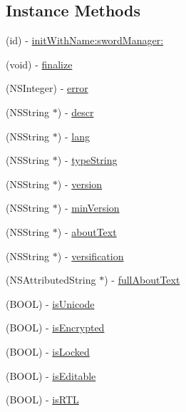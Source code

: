 \subsection*{Instance Methods}
\begin{DoxyCompactItemize}
\item 
(id) -\/ \hyperlink{interface_sword_module_a59d9654a2481d74c2f4d08c15a4910ce}{init\-With\-Name\-:sword\-Manager\-:}
\item 
(void) -\/ \hyperlink{interface_sword_module_a32d626626eee0bc4ade146973f6abb1c}{finalize}
\item 
(N\-S\-Integer) -\/ \hyperlink{interface_sword_module_a858c65e7444a8af0882d553c434506b0}{error}
\item 
(N\-S\-String $\ast$) -\/ \hyperlink{interface_sword_module_af4a37ce3ea3b890960a6449e74ca43a4}{descr}
\item 
(N\-S\-String $\ast$) -\/ \hyperlink{interface_sword_module_aad136d689eb81aac088afbf4c5e150aa}{lang}
\item 
(N\-S\-String $\ast$) -\/ \hyperlink{interface_sword_module_a12da8ac9bf5e99bead6882dbddf4eafb}{type\-String}
\item 
(N\-S\-String $\ast$) -\/ \hyperlink{interface_sword_module_a806fdedd0e4bb74dd72852de6e4b25e2}{version}
\item 
(N\-S\-String $\ast$) -\/ \hyperlink{interface_sword_module_a7871356ed4013fe0e3e97a1d8a6420a6}{min\-Version}
\item 
(N\-S\-String $\ast$) -\/ \hyperlink{interface_sword_module_afc5e2e8c8cb92b65c1c6787b4ea150b9}{about\-Text}
\item 
(N\-S\-String $\ast$) -\/ \hyperlink{interface_sword_module_a63345e3292386bca3dea93ea966e577a}{versification}
\item 
(N\-S\-Attributed\-String $\ast$) -\/ \hyperlink{interface_sword_module_adbc45ab9c8faf2c956ac6be354918831}{full\-About\-Text}
\item 
(B\-O\-O\-L) -\/ \hyperlink{interface_sword_module_a1b924225e17c0d4a682211415b52920f}{is\-Unicode}
\item 
(B\-O\-O\-L) -\/ \hyperlink{interface_sword_module_acf7e3b99952dabff9846958618582472}{is\-Encrypted}
\item 
(B\-O\-O\-L) -\/ \hyperlink{interface_sword_module_a4951c13cfe4c35669ec31259e4967e7c}{is\-Locked}
\item 
(B\-O\-O\-L) -\/ \hyperlink{interface_sword_module_adc1929ecf46112716a28547541474e72}{is\-Editable}
\item 
(B\-O\-O\-L) -\/ \hyperlink{interface_sword_module_a62a3b2a99468ef6bc2aeda272af20400}{is\-R\-T\-L}

\end{DoxyCompactItemize}
